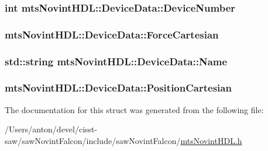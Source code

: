 \subsubsection[{Device\+Number}]{\setlength{\rightskip}{0pt plus 5cm}int mts\+Novint\+H\+D\+L\+::\+Device\+Data\+::\+Device\+Number}\label{structmts_novint_h_d_l_1_1_device_data_a9bd1b2ab0ac17be34d64b2ad1de156a2}
\hypertarget{structmts_novint_h_d_l_1_1_device_data_a0cdc951bd1b42f4f2d600edf415ba181}{}
\subsubsection[{Force\+Cartesian}]{ mts\+Novint\+H\+D\+L\+::\+Device\+Data\+::\+Force\+Cartesian}\label{structmts_novint_h_d_l_1_1_device_data_a0cdc951bd1b42f4f2d600edf415ba181}
\hypertarget{structmts_novint_h_d_l_1_1_device_data_a680dd117f9b6f0b13ef2142d72c507ff}{}
\subsubsection[{Name}]{\setlength{\rightskip}{0pt plus 5cm}std\+::string mts\+Novint\+H\+D\+L\+::\+Device\+Data\+::\+Name}\label{structmts_novint_h_d_l_1_1_device_data_a680dd117f9b6f0b13ef2142d72c507ff}
\hypertarget{structmts_novint_h_d_l_1_1_device_data_ac93b06cca79ba9eeb52df9d2f0931276}{}
\subsubsection[{Position\+Cartesian}]{ mts\+Novint\+H\+D\+L\+::\+Device\+Data\+::\+Position\+Cartesian}\label{structmts_novint_h_d_l_1_1_device_data_ac93b06cca79ba9eeb52df9d2f0931276}


The documentation for this struct was generated from the following file\+:\begin{DoxyCompactItemize}
\item 
/\+Users/anton/devel/cisst-\/saw/saw\+Novint\+Falcon/include/saw\+Novint\+Falcon/\hyperlink{mts_novint_h_d_l_8h}{mts\+Novint\+H\+D\+L.\+h}\end{DoxyCompactItemize}
